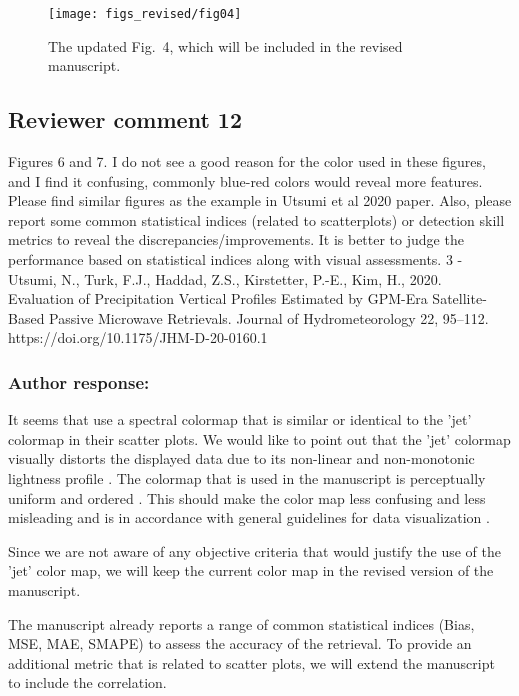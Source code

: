 \begin{figure}[hbpt]
  \centering
    \texttt{[image: figs\_revised/fig04]}
    \caption{
      The updated Fig.~4, which will be included in the revised manuscript.
    }
  \label{fig:data_augmentation}
\end{figure}

\subsection*{Reviewer comment 12}


Figures 6 and 7. I do not see a good reason for the color used in these figures,
and I find it confusing, commonly blue-red colors would reveal more features.
Please find similar figures as the example in Utsumi et al 2020 paper. Also,
please report some common statistical indices (related to scatterplots) or
detection skill metrics to reveal the discrepancies/improvements. It is better
to judge the performance based on statistical indices along with visual
assessments. 3 - Utsumi, N., Turk, F.J., Haddad, Z.S., Kirstetter, P.-E., Kim,
H., 2020. Evaluation of Precipitation Vertical Profiles Estimated by GPM-Era
Satellite-Based Passive Microwave Retrievals. Journal of Hydrometeorology 22,
95–112. https://doi.org/10.1175/JHM-D-20-0160.1


\subsubsection*{Author response:}

It seems that \citet{utsumi21} use a spectral colormap that is similar  or
identical to the 'jet' colormap in their scatter plots. We would like to point
out that the 'jet' colormap visually distorts the displayed data due to its
non-linear and non-monotonic lightness profile \citep{thyng16}. The colormap
that is used in the manuscript is perceptually uniform and ordered
\citep{matplotlib_colormaps}. This should make the color map less confusing
and less misleading and is in accordance with general guidelines for data visualization
\citep{borland07}.

Since we are not aware of any objective criteria that would justify the use of
the 'jet' color map, we will keep the current color map in the revised version
of the manuscript.

The manuscript already reports a range of common statistical indices
(Bias, MSE, MAE, SMAPE) to assess the accuracy of the retrieval. To provide an
additional metric that is related to scatter plots, we will extend the manuscript
to include the correlation.

